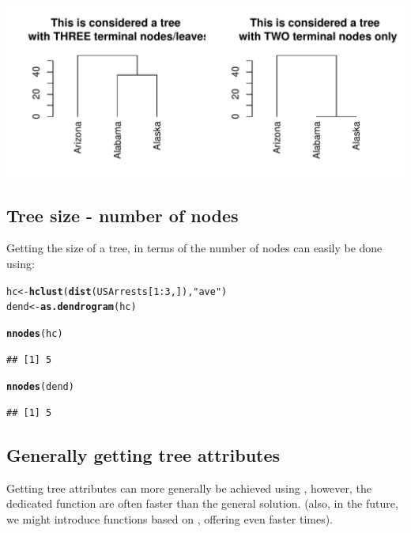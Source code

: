 \documentclass[shortnames,nojss,article]{jss}\usepackage{graphicx, color}
\makeatletter
\def\maxwidth{ %
  \ifdim\Gin@nat@width>\linewidth
    \linewidth
  \else
    \Gin@nat@width
  \fi
}
\newcommand{\hlfunctioncall}[1]{\textcolor[rgb]{0.501960784313725,0,0.329411764705882}{\textbf{#1}}}%
\newcommand{\hlstring}[1]{\textcolor[rgb]{0.6,0.6,1}{#1}}%
\newenvironment{kframe}{%
 \def\at@end@of@kframe{}%
 \ifinner\ifhmode%
  \def\at@end@of@kframe{\end{minipage}}%
  \begin{minipage}{\columnwidth}%
 \fi\fi%
 \def\FrameCommand##1{\hskip\@totalleftmargin \hskip-\fboxsep
 \colorbox{shadecolor}{##1}\hskip-\fboxsep
     \hskip-\linewidth \hskip-\@totalleftmargin \hskip\columnwidth}%
 \MakeFramed {\advance\hsize-\width
   \@totalleftmargin\z@ \linewidth\hsize
   \@setminipage}}%
 {\par\unskip\endMakeFramed%
 \at@end@of@kframe}
\newenvironment{knitrout}{}{} %
\makeatother
\begin{document}
\begin{knitrout}
{\centering \includegraphics[width=\maxwidth]{figure/unnamed-chunk-19} 

}



\end{knitrout}



\subsection{Tree size - number of nodes}

Getting the size of a tree, in terms of the number of nodes can easily be done using:

\begin{knitrout}
\color{fgcolor}\begin{kframe}
\begin{alltt}
hc <- \hlfunctioncall{hclust}(\hlfunctioncall{dist}(USArrests[1:3, ]), \hlstring{"ave"})
dend <- \hlfunctioncall{as.dendrogram}(hc)

\hlfunctioncall{nnodes}(hc)
\end{alltt}
\begin{verbatim}
## [1] 5
\end{verbatim}
\begin{alltt}
\hlfunctioncall{nnodes}(dend)
\end{alltt}
\begin{verbatim}
## [1] 5
\end{verbatim}
\end{kframe}
\end{knitrout}




\subsection{Generally getting tree attributes}

Getting tree attributes can more generally be achieved using , however, the dedicated function are often faster than the general solution. (also, in the future, we might introduce functions based on , offering even faster times).
\end{document}
